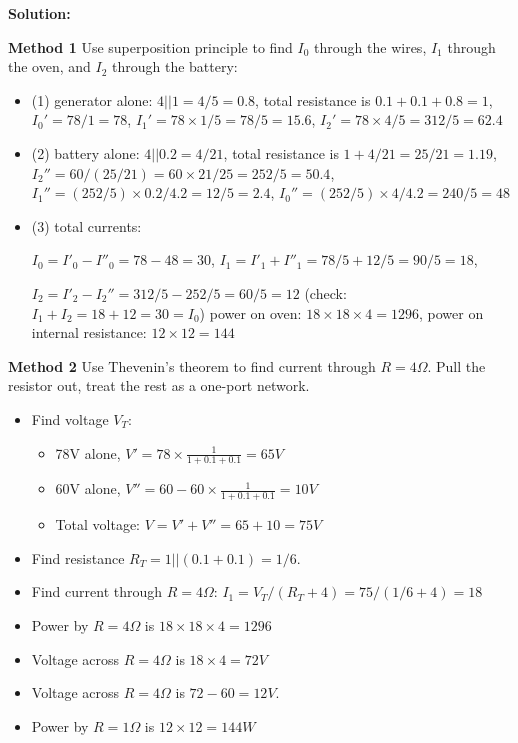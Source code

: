 \begin{enumerate}

{\bf Solution:}

{\bf Method 1} Use superposition principle to find $I_0$ through the wires, 
$I_1$ through the oven, and $I_2$ through the battery:

\begin{itemize}
\item (1) generator alone: $4 || 1=4/5=0.8$, total resistance is 
	$0.1+0.1+0.8=1$, $I_0'=78/1=78$, $I_1'=78 \times 1/5=78/5=15.6$, 
	$I_2'=78 \times 4/5=312/5=62.4$

\item (2) battery alone: $4 || 0.2=4/21$, total resistance is 
	$1+4/21=25/21=1.19$, $I_2''=60/(25/21)=60\times 21/25=252/5=50.4$, 
	$I_1''=(252/5) \times 0.2/4.2=12/5=2.4$,
 	$I_0''=(252/5) \times 4/4.2=240/5=48$

\item (3) total currents:

 $I_0=I'_0-I''_0=78-48=30$, $I_1=I'_1+I''_1=78/5+12/5=90/5=18$, 

 $I_2=I'_2-I_2''=312/5-252/5=60/5=12$ (check: $I_1+I_2=18+12=30=I_0$)
 power on oven: $18\times 18\times 4=1296$, power on internal resistance: $12\times 12=144$

\end{itemize}

{\bf Method 2} Use Thevenin's theorem to find current through $R=4\Omega$.
Pull the resistor out, treat the rest as a one-port network. 
\begin{itemize}
\item Find voltage $V_T$:
\begin{itemize}
\item 78V alone, $V'=78\times \frac{1}{1+0.1+0.1}=65V$
\item 60V alone, $V''=60-60\times \frac{1}{1+0.1+0.1}=10V$
\item Total voltage: $V=V'+V''=65+10=75V$
\end{itemize}
\item Find resistance $R_T=1 || (0.1+0.1)=1/6$.
\item Find current through $R=4\Omega$:
	$I_1=V_T/(R_T+4)=75/(1/6+4)=18$
\item Power by $R=4\Omega$ is $18\times 18\times 4=1296$
\item Voltage across $R=4\Omega$ is $18\times 4=72V$
\item Voltage across $R=4\Omega$ is $72-60=12V$.
\item Power by $R=1\Omega$ is $12\times 12=144 W$
\end{itemize}


\end{enumerate}
